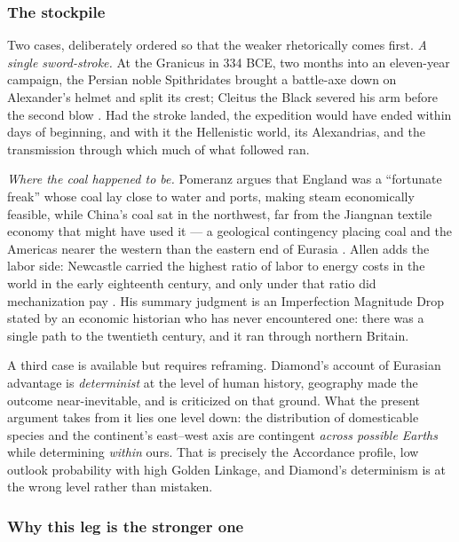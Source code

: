 \documentclass[11pt]{article}
\numberwithin{equation}{section}
\theoremstyle{plain}
\theoremstyle{definition}
\theoremstyle{remark}
\begin{document}
\subsubsection{The stockpile}\label{gc:subsub:stockpile}

Two cases, deliberately ordered so that the weaker rhetorically comes
first. \emph{A single sword-stroke.} At the Granicus in 334 BCE, two months
into an eleven-year campaign, the Persian noble Spithridates brought a
battle-axe down on Alexander's helmet and split its crest; Cleitus the
Black severed his arm before the second blow \cite{Arrian,
PlutarchAlex}. Had the stroke landed, the expedition would have ended
within days of beginning, and with it the Hellenistic world, its
Alexandrias, and the transmission through which much of what followed
ran.

\emph{Where the coal happened to be.} Pomeranz argues that England was
a ``fortunate freak'' whose coal lay close to water and ports, making
steam economically feasible, while China's coal sat in the northwest,
far from the Jiangnan textile economy that might have used it ---
a geological contingency placing coal and the Americas nearer the
western than the eastern end of Eurasia \cite{Pomeranz00}. Allen adds
the labor side: Newcastle carried the highest ratio of labor to energy
costs in the world in the early eighteenth century, and only under that
ratio did mechanization pay \cite{Allen09}. His summary judgment is
an Imperfection Magnitude Drop stated by an economic historian who has
never encountered one: there was a single path to the twentieth century,
and it ran through northern Britain.

A third case is available but requires reframing. Diamond's account of
Eurasian advantage \cite{Diamond97} is \emph{determinist} at the level
of human history, geography made the outcome near-inevitable, and
is criticized on that ground. What the present argument takes from it
lies one level down: the distribution of domesticable species and the
continent's east--west axis are contingent \emph{across possible
Earths} while determining \emph{within} ours. That is precisely the
Accordance profile, low outlook probability with high Golden Linkage,
and Diamond's determinism is at the wrong level rather than mistaken.

\subsubsection{Why this leg is the stronger one}
\label{gc:subsub:strongerleg}
\end{document}

